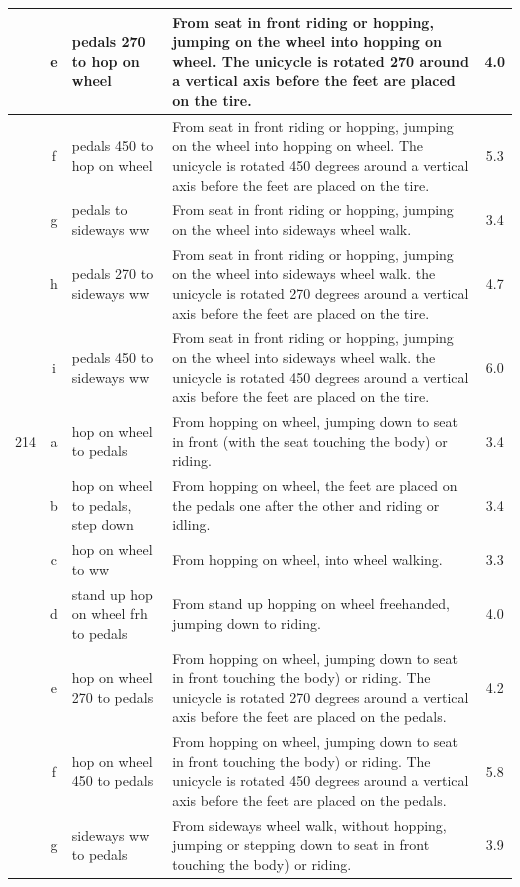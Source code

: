\begin{longtable}{|r|c|p{4cm}|p{8cm}|c|}
\hline
  & e & pedals 270 to hop on wheel  & From seat in front riding or hopping, jumping on the wheel into hopping on wheel. The unicycle is rotated 270 around a vertical axis before the feet are placed on the tire.  & 4.0 \\ 
\hline
  & f & pedals 450 to hop on wheel  & From seat in front riding or hopping, jumping on the wheel into hopping on wheel. The unicycle is rotated 450 degrees around a vertical axis before the feet are placed on the tire.  & 5.3 \\ 
\hline
  & g & pedals to sideways ww & From seat in front riding or hopping, jumping on the wheel into sideways wheel walk.  & 3.4 \\ 
\hline
  & h & pedals 270 to sideways ww & From seat in front riding or hopping, jumping on the wheel into sideways wheel walk. the unicycle is rotated 270 degrees around a vertical axis before the feet are placed on the tire. & 4.7 \\ 
\hline
  & i & pedals 450 to sideways ww & From seat in front riding or hopping, jumping on the wheel into sideways wheel walk. the unicycle is rotated 450 degrees around a vertical axis before the feet are placed on the tire. & 6.0 \\ 
\hline
214 & a & hop on wheel to pedals  & From hopping on wheel, jumping down to seat in front (with the seat touching the body) or riding. & 3.4 \\ 
\hline
  & b & hop on wheel to pedals, step down & From hopping on wheel, the feet are placed on the pedals one after the other and riding or idling.  & 3.4 \\ 
\hline
  & c & hop on wheel to ww  & From hopping on wheel, into wheel walking.  & 3.3 \\ 
\hline
  & d & stand up hop on wheel frh to pedals & From stand up hopping on wheel freehanded, jumping down to riding.  & 4.0 \\ 
\hline
  & e & hop on wheel 270 to pedals  & From hopping on wheel, jumping down to seat in front touching the body) or riding. The unicycle is rotated 270 degrees around a vertical axis before the feet are placed on the pedals. & 4.2 \\ 
\hline
  & f & hop on wheel 450 to pedals  & From hopping on wheel, jumping down to seat in front touching the body) or riding. The unicycle is rotated 450 degrees around a vertical axis before the feet are placed on the pedals. & 5.8 \\ 
\hline
  & g & sideways ww to pedals & From sideways wheel walk, without hopping, jumping or stepping down to seat in front touching the body) or riding.  & 3.9 \\ 

\end{longtable}

